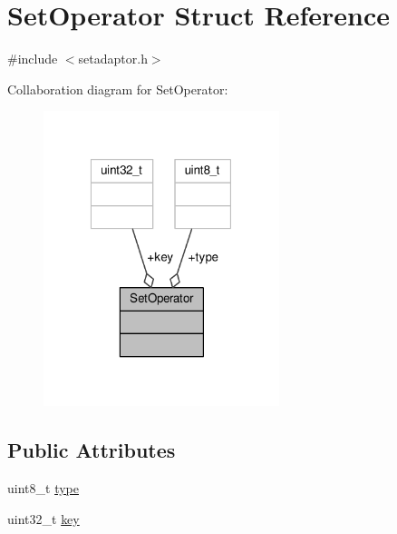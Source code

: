 \hypertarget{structSetOperator}{\section{Set\-Operator Struct Reference}
\label{structSetOperator}
}


{\ttfamily \#include $<$setadaptor.\-h$>$}



Collaboration diagram for Set\-Operator\-:
\nopagebreak
\begin{figure}[H]
\begin{center}
\leavevmode
\includegraphics[width=195pt]{structSetOperator__coll__graph}
\end{center}
\end{figure}
\subsection*{Public Attributes}
\begin{DoxyCompactItemize}
\item 
uint8\-\_\-t \hyperlink{structSetOperator_a86e4024f246f1d52a823213f46fcfb85}{type}
\item 
uint32\-\_\-t \hyperlink{structSetOperator_a18589e630d741299cd82ae90a253876a}{key}
\end{DoxyCompactItemize}


